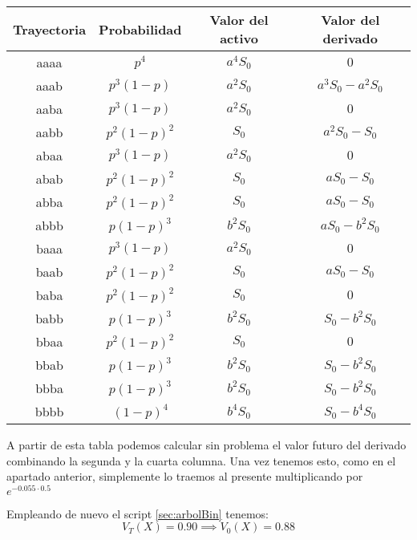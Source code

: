 \begin{problem}[1]
\begin{center}
\begin{tabular}{|c|c|c|c|}
\hline
\textbf{Trayectoria} & \textbf{Probabilidad} & \textbf{Valor del activo} & \textbf{Valor del derivado}\\
\hline
aaaa & $p^4$        & $a^4S_0$ & $0$ \\
aaab & $p^3(1-p)$   & $a^2S_0$ & $a^3S_0-a^2S_0$ \\
aaba & $p^3(1-p)$   & $a^2S_0$ & $0$ \\
aabb & $p^2(1-p)^2$ & $S_0$ & $a^2S_0-S_0$ \\
abaa & $p^3(1-p)$   & $a^2S_0$ & $0$ \\
abab & $p^2(1-p)^2$ & $S_0$ & $aS_0-S_0$ \\
abba & $p^2(1-p)^2$ & $S_0$ & $aS_0-S_0$ \\
abbb & $p(1-p)^3$   & $b^2S_0$ & $aS_0-b^2S_0$ \\
baaa & $p^3(1-p)$   & $a^2S_0$ & $0$ \\
baab & $p^2(1-p)^2$ & $S_0$ & $aS_0-S_0$ \\
baba & $p^2(1-p)^2$ & $S_0$ & $0$ \\
babb & $p(1-p)^3$   & $b^2S_0$ & $S_0-b^2S_0$ \\
bbaa & $p^2(1-p)^2$ & $S_0$ & $0$ \\
bbab & $p(1-p)^3$   & $b^2S_0$ & $S_0-b^2S_0$ \\
bbba & $p(1-p)^3$   & $b^2S_0$ & $S_0-b^2S_0$ \\
bbbb & $(1-p)^4$    & $b^4S_0$ & $S_0-b^4S_0$ \\
\hline
\end{tabular}
\end{center}

A partir de esta tabla podemos calcular sin problema el valor futuro del derivado combinando la segunda y la cuarta columna. Una vez tenemos esto, como en el apartado anterior, simplemente lo traemos al presente multiplicando por $e^{-0.055\cdot 0.5}$

Empleando de nuevo el script \ref{sec:arbolBin} tenemos:
\[V_T(X) = 0.90 \implies V_0(X) = 0.88\]
\end{problem}

